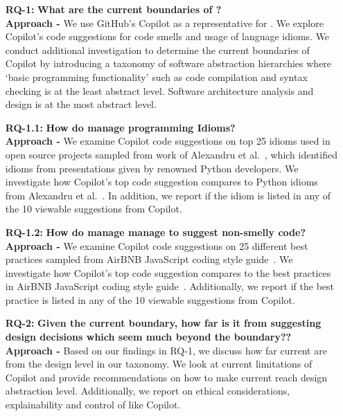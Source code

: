 \begin{enumerate}
  \item[\textbf{RQ-1: }]
  \textbf{What are the current boundaries of \cct{}?} \\
  \textbf{Approach -} We use GitHub's Copilot as a representative for \cct{}. We explore Copilot's code suggestions for code smells and usage of language idioms. We conduct additional investigation to determine the current boundaries of Copilot by introducing a taxonomy of software abstraction hierarchies where ‘basic programming functionality’ such as code compilation and syntax checking is at the least abstract level. Software architecture analysis and design is at the most abstract level. 
  
  \item[\textbf{RQ-1.1: }]
  \textbf{How do \cct{} manage programming Idioms?} \\
  \textbf{Approach -} We examine Copilot code suggestions on top 25 idioms used in open source projects sampled from work of Alexandru et al.~\cite{Alexandru2018}, which identified idioms from presentations given by renowned Python developers. We investigate how Copilot's top code suggestion compares to Python idioms from Alexandru et al.~\cite{Alexandru2018}. In addition, we report if the idiom is listed in any of the 10 viewable suggestions from Copilot.
  
  \item[\textbf{RQ-1.2: }]
  \textbf{How do \cct{} manage manage to suggest non-smelly code?} \\
\textbf{Approach -} We examine Copilot code suggestions on 25 different best practices sampled from AirBNB JavaScript coding style guide~\cite{airbnb_code}. We investigate how Copilot's top code suggestion compares to the best practices in AirBNB JavaScript coding style guide~\cite{airbnb_code}. Additionally, we report if the best practice is listed in any of the 10 viewable suggestions from Copilot. 
 
  \item[\textbf{RQ-2: }]
  \textbf{Given the current boundary, how far is it from suggesting design decisions which seem much beyond the boundary??} \\
  \textbf{Approach -} Based on our findings in RQ-1, we discuss how far current \cct{} are from the design level in our taxonomy. We look at current limitations of Copilot and provide recommendations on how to make current \cct{} reach design abstraction level. Additionally, we report on ethical considerations, explainability and control of \cct{} like Copilot. 
\end{enumerate}